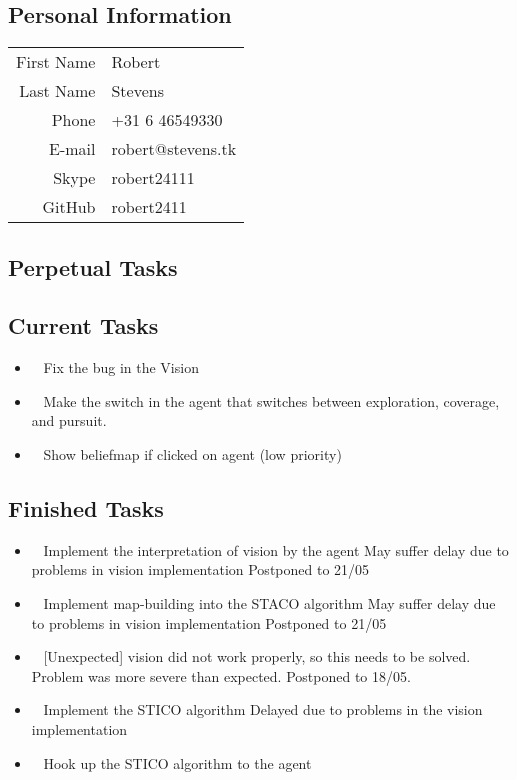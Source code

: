 \subsection{Personal Information}
\begin{table}[h!]
	\begin{tabular}{rl}
	First Name 	& Robert\\
	Last Name	& Stevens\\
	Phone		& +31 6 46549330\\
	E-mail		& robert@stevens.tk\\
	Skype		& robert24111\\
	GitHub		& robert2411
\end{tabular}
\end{table}

\subsection{Perpetual Tasks}

\subsection{Current Tasks}
\begin{itemize}
	\item~
	Fix the bug in the Vision
	\item~
	Make the switch in the agent that switches between exploration, coverage, and pursuit.
	\item~\marginpar{-}
	Show beliefmap if clicked on agent (low priority)
\end{itemize}

\subsection{Finished Tasks}
\begin{itemize}
	\item~
	Implement the interpretation of vision by the agent
		\subitem May suffer delay due to problems in vision implementation
		\subitem Postponed to 21/05
	\item~
	Implement map-building into the STACO algorithm
		\subitem May suffer delay due to problems in vision implementation
		\subitem Postponed to 21/05
	\item~
	[Unexpected] vision did not work properly, so this needs to be solved.
		\subitem Problem was more severe than expected. Postponed to 18/05.
	\item~
	Implement the STICO algorithm
		\subitem Delayed due to problems in the vision implementation
	\item~
	Hook up the STICO algorithm to the agent
\end{itemize}
